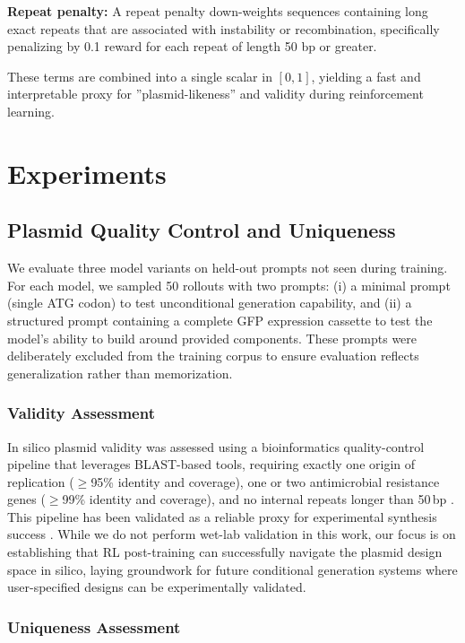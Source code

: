 \documentclass{article}
\theoremstyle{plain}
\theoremstyle{definition}
\theoremstyle{remark}
\begin{document}
\textbf{Repeat penalty:} A repeat penalty down-weights sequences
containing long exact repeats that are associated with instability or
recombination, specifically penalizing by 0.1 reward for each repeat of length 50 bp or greater.

These terms are combined into a single scalar in $[0,1]$, yielding a
fast and interpretable proxy for ''plasmid-likeness'' and validity during
reinforcement learning.

\section{Experiments}

\subsection{Plasmid Quality Control and Uniqueness}

We evaluate three model variants on held-out prompts not seen during
training. For each model, we sampled 50 rollouts with two prompts: (i) a
minimal prompt (single ATG codon) to test unconditional generation
capability, and (ii) a structured prompt containing a complete GFP
expression cassette to test the model's ability to build around provided
components. These prompts were deliberately excluded from the training
corpus to ensure evaluation reflects generalization rather than
memorization.

\subsubsection{Validity Assessment}

In silico plasmid validity was assessed using a bioinformatics
quality-control pipeline that leverages BLAST-based tools, requiring
exactly one origin of replication ($\geq$95\% identity and coverage),
one or two antimicrobial resistance genes ($\geq$99\% identity and
coverage), and no internal repeats longer than 50\,bp \cite{blast}. This
pipeline has been validated as a reliable proxy for experimental
synthesis success \cite{angus}. While we do not perform wet-lab
validation in this work, our focus is on establishing that RL
post-training can successfully navigate the plasmid design space in
silico, laying groundwork for future conditional generation systems where
user-specified designs can be experimentally validated.

\subsubsection{Uniqueness Assessment}
\end{document}
